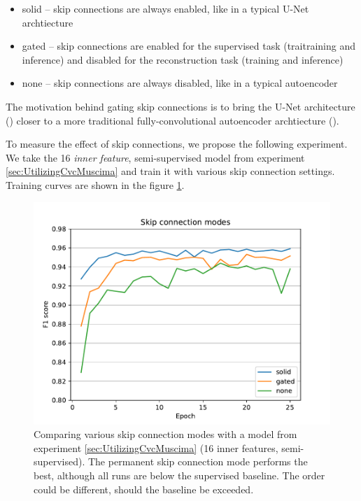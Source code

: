 \begin{itemize}
    \item solid -- skip connections are always enabled, like in a typical U-Net archtiecture
    \item gated -- skip connections are enabled for the supervised task (traitraining and inference) and disabled for the reconstruction task (training and inference)
    \item none -- skip connections are always disabled, like in a typical autoencoder
\end{itemize}

The motivation behind gating skip connections is to bring the U-Net architecture (\cite{UNet}) closer to a more traditional fully-convolutional autoencoder archtiecture (\cite{AutoencodersOverview}).

To measure the effect of skip connections, we propose the following experiment. We take the 16 \emph{inner feature}, semi-supervised model from experiment \ref{sec:UtilizingCvcMuscima} and train it with various skip connection settings. Training curves are shown in the figure \ref{fig:SkipConnections}.

\begin{figure}[ht]
    \centering
    \includegraphics[width=140mm]{../../figures/05-skip-connections/skip.pdf}
    \caption{Comparing various skip connection modes with a model from experiment \ref{sec:UtilizingCvcMuscima} (16 inner features, semi-supervised). The permanent skip connection mode performs the best, although all runs are below the supervised baseline. The order could be different, should the baseline be exceeded.}
    \label{fig:SkipConnections}
\end{figure}

